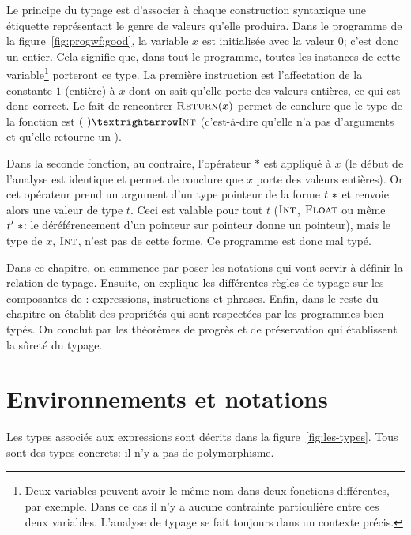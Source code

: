 Le principe du typage est d'associer à chaque construction syntaxique une
étiquette représentant le genre de valeurs qu'elle produira. Dans le programme
de la figure~\ref{fig:progwf:good}, la variable $x$ est initialisée avec la
valeur $0$; c'est donc un entier. Cela signifie que, dans tout le programme,
toutes les instances de cette variable\footnote{Deux variables peuvent avoir le
même nom dans deux fonctions différentes, par exemple. Dans ce cas il n'y a
aucune contrainte particulière entre ces deux variables. L'analyse de typage se
fait toujours dans un contexte précis. } porteront ce type. La première
instruction est l'affectation de la constante $1$ (entière) à $x$ dont on sait
qu'elle porte des valeurs entières, ce qui est donc correct. Le fait de
rencontrer $\textsc{Return}(x)$ permet de conclure que le type de la fonction est $(~)
→ \tInt$ (c'est-à-dire qu'elle n'a pas d'arguments et qu'elle retourne un
\tInt).

Dans la seconde fonction, au contraire, l'opérateur $*$ est appliqué à $x$ (le
début de l'analyse est identique et permet de conclure que $x$ porte des valeurs
entières). Or cet opérateur prend un argument d'un type pointeur de la forme
$t~*$ et renvoie alors une valeur de type $t$. Ceci est valable pour tout
$t$ ($\textsc{Int}$, $\textsc{Float}$ ou même $t'~*$: le déréférencement d'un pointeur
sur pointeur donne un pointeur), mais le type de $x$, $\textsc{Int}$, n'est pas de
cette forme. Ce programme est donc mal typé.

Dans ce chapitre, on commence par poser les notations qui vont servir à définir
la relation de typage. Ensuite, on explique les différentes règles de typage sur
les composantes de \langname: expressions, instructions et phrases. Enfin, dans
le reste du chapitre on établit des propriétés qui sont respectées par les
programmes bien typés. On conclut par les théorèmes de progrès et de
préservation qui établissent la sûreté du typage.

\section{Environnements et notations}

Les types associés aux expressions sont décrits dans la
figure~\ref{fig:les-types}. Tous sont des types concrets: il n'y a pas de
polymorphisme.


